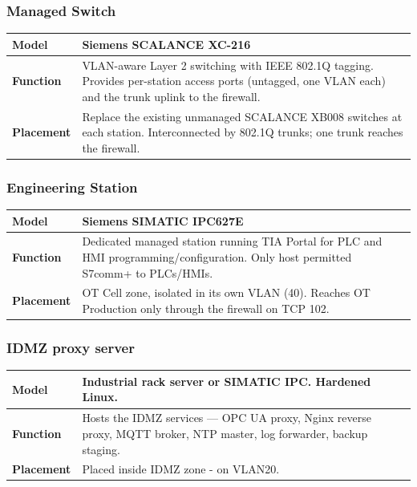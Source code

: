 \subsubsection{Managed Switch}
\renewcommand{\arraystretch}{1.3} %
\begin{tabularx}{\textwidth}{>{\bfseries}p{2.5cm} X}
    \toprule
    Model & Siemens SCALANCE XC-216  \\
    \midrule
    Function & VLAN-aware Layer 2 switching with IEEE 802.1Q tagging. Provides per-station access ports (untagged, one VLAN each) and the trunk uplink to the firewall. \\
    \midrule
    Placement & Replace the existing unmanaged SCALANCE XB008 switches at each station. Interconnected by 802.1Q trunks; one trunk reaches the firewall. \\
    \midrule
\end{tabularx}

\subsubsection{Engineering Station}
\renewcommand{\arraystretch}{1.3} %
\begin{tabularx}{\textwidth}{>{\bfseries}p{2.5cm} X}
    \toprule
    Model & Siemens SIMATIC IPC627E\\
    \midrule
    Function & Dedicated managed station running TIA Portal for PLC and HMI programming/configuration. Only host permitted S7comm+ to PLCs/HMIs.\\
    \midrule
    Placement & OT Cell zone, isolated in its own VLAN (40). Reaches OT Production only through the firewall on TCP 102.\\
    \midrule
\end{tabularx}

\subsubsection{IDMZ proxy server}
\renewcommand{\arraystretch}{1.3} %
\begin{tabularx}{\textwidth}{>{\bfseries}p{2.5cm} X}
    \toprule
    Model & Industrial rack server or SIMATIC IPC. Hardened Linux.\\
    \midrule
    Function & Hosts the IDMZ services — OPC UA proxy, Nginx reverse proxy, MQTT broker, NTP master, log forwarder, backup staging. \\
    \midrule
    Placement & Placed inside IDMZ zone - on VLAN20. \\
    \midrule
\end{tabularx}

